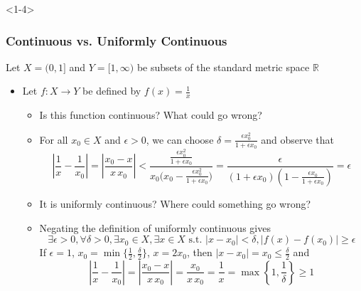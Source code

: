 \documentclass[10pt,english,aspectratio=169]{beamer}
\begin{document}
\begin{frame}<1-4>
\frametitle{Continuous vs. Uniformly Continuous}

\vspace{1mm}
Let $X = (0,1]$ and $Y=[1,\infty)$ be subsets of the standard metric space $\mathbb{R}$
\vspace{1mm}

\begin{itemize}
\setlength\itemsep{3mm}
\item<1-> Let $f:X \to Y$ be defined by $f(x) = \frac{1}{x}$ \vspace{1mm}

\begin{itemize} 
  \setlength\itemsep{1.5mm}
  \item<1-> Is this function continuous?  What could go wrong?
  \item<2-> For all $x_0 \in X$ and $\epsilon>0$, we can choose $\delta = \frac{\epsilon x_0^2}{1+\epsilon x_0}$ and observe that \vspace{-2mm}
  \[ \left| \frac{1}{x}-\frac{1}{x_0} \right| = \left| \frac{x_0 - x}{x \, x_0} \right| < \frac{\frac{\epsilon x_0^2}{1+\epsilon x_0}}{x_0 \big( x_0 - \frac{\epsilon x_0^2}{1+\epsilon x_0} \big)} = \frac{\epsilon}{(1+\epsilon x_0)( 1 - \frac{\epsilon x_0}{1+\epsilon x_0})} = \epsilon\] \vspace{-0.5mm}
  
  \item<3-> It is uniformly continuous? Where could something go wrong?
  
  \item<4-> Negating the definition of uniformly continuous gives \vspace{-2mm} \[\!\!\!\!\!\!\!\exists \epsilon >0, \forall \delta >0, \exists x_0 \in X, \exists x\in X \text{ s.t. } |x-x_0|<\delta, |f(x)-f(x_0)|\geq \epsilon \]
  If $\epsilon = 1$, $x_0 = \min\big\{ \frac{1}{2},\frac{\delta}{2} \big\}$, $x=2 x_0$, then $| x - x_0 | = x_0 \leq \frac{\delta}{2}$ and \vspace{-1mm}
    \[ \left| \frac{1}{x}-\frac{1}{x_0} \right| = \left| \frac{x_0 - x}{x \, x_0} \right| = \frac{x_0}{x \, x_0} = \frac{1}{x} = \max\left\{1,\frac{1}{\delta}\right\} \geq 1 \]

\end{itemize}

\end{itemize}


\end{frame}
\end{document}
